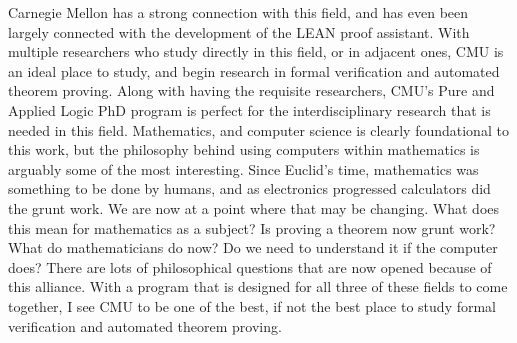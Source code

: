 \documentclass[11pt]{article}
\begin{document}
Carnegie Mellon has a strong connection with this field, and has even been largely connected with the development of the LEAN proof assistant. With multiple researchers who study directly in this field, or in adjacent ones, CMU is an ideal place to study, and begin research in formal verification and automated theorem proving. Along with having the requisite researchers, CMU's Pure and Applied Logic PhD program is perfect for the interdisciplinary research that is needed in this field. Mathematics, and computer science is clearly foundational to this work, but the philosophy behind using computers within mathematics is arguably some of the most interesting. Since Euclid's time, mathematics was something to be done by humans, and as electronics progressed calculators did the grunt work. We are now at a point where that may be changing. What does this mean for mathematics as a subject? Is proving a theorem now grunt work? What do mathematicians do now? Do we need to understand it if the computer does? There are lots of philosophical questions that are now opened because of this alliance. With a program that is designed for all three of these fields to come together, I see CMU to be one of the best, if not the best place to study formal verification and automated theorem proving.
\end{document}
